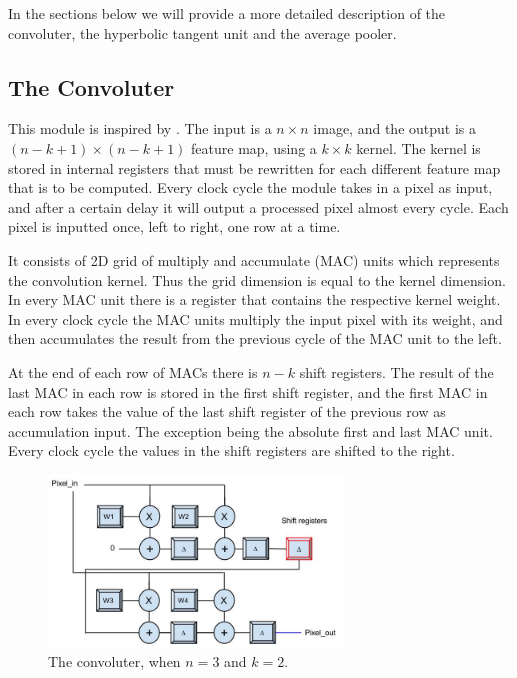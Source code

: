 In the sections below we will provide a more detailed description of the convoluter, the hyperbolic tangent unit and the average pooler. 


\subsection{The Convoluter} \label{sec_convoluter}

This module is inspired by \cite{Farabet2009}. The input is a $ n \times n $ image, and the output is a $ (n-k+1) \times (n-k+1) $ feature map, using a $ k \times k $ kernel. The kernel is stored in internal registers that must be rewritten for each different feature map that is to be computed. Every clock cycle the module takes in a pixel as input, and after a certain delay it will output a processed pixel almost every cycle. Each pixel is inputted once, left to right, one row at a time. 

It consists of 2D grid of multiply and accumulate (MAC) units which represents the convolution kernel. Thus the grid dimension is equal to the kernel dimension. In every MAC unit there is a register that contains the respective kernel weight. In every clock cycle the MAC units multiply the input pixel with its weight, and then accumulates the result from the previous cycle of the MAC unit to the left. 

At the end of each row of MACs there is $ n - k $ shift registers. The result of the last MAC in each row is stored in the first shift register, and the first MAC in each row takes the value of the last shift register of the previous row as accumulation input. The exception being the absolute first and last MAC unit. Every clock cycle the values in the shift registers are shifted to the right. 

\begin{figure}[h!]
  \centering
      \includegraphics[width=0.7\textwidth]{Figures/Method/Convolver}
  \caption[The convoluter ]{The convoluter, when $ n = 3 $ and $ k = 2 $.}
\end{figure}
	
